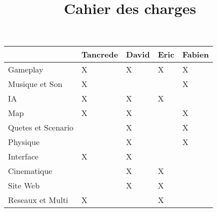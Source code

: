 \documentclass[12pt,a4paper]{report}
\title{Cahier des charges}
\begin{document}
\renewcommand\thechapter{\Roman{chapter}}
\thispagestyle{empty}
\begin{center}
{\fontsize{30}{32}{\textbf{\textcolor{red}{Epit'S'cape}}}}
\par
\vspace*{0.5cm}
{}
\par
{\fontsize{15}{18}{\textcolor{couleur_titre}{\textbf{\today}}}}
\end{center}
\vspace*{0.5cm}

\begin{tabular}{|R{3.5cm}||C{1.5cm}|C{1.5cm}|C{1.5cm}|C{1.5cm}|}
\hline  & Tancrede & David & Eric & Fabien\\
\hline  Gameplay & X & X & X & X \\
\hline  Musique et Son & X &  &  & X\\
\hline  IA & X & X & X &   \\
\hline  Map & X & X &  & X  \\
\hline  Quetes et Scenario &  & X &  & X\\
\hline  Physique &  & X &  & X \\
\hline  Interface & X & X &  &  \\
\hline  Cinematique &  & X & X &  \\
\hline  Site Web &  & X & X &  \\
\hline  Reseaux et Multi & X &  & X &  \\
\hline  
\end{tabular}\\ 
\\\\\\\\\\
\end{document}
